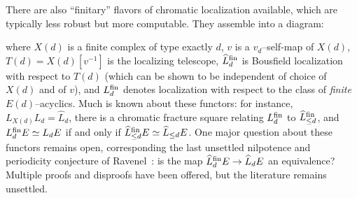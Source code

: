 \begin{remark}
There are also ``finitary'' flavors of chromatic localization available, which are typically less robust but more computable.  They assemble into a diagram:
\begin{center}
\end{center}
where $X(d)$ is a finite complex of type exactly $d$, $v$ is a $v_d$--self-map of $X(d)$, $T(d) = X(d)[v^{-1}]$ is the localizing telescope, $\widehat L_d^{\mathrm{fin}}$ is Bousfield localization with respect to $T(d)$ (which can be shown to be independent of choice of $X(d)$ and of $v$), and $L_d^{\mathrm{fin}}$ denotes localization with respect to the class of \emph{finite} $E(d)$--acyclics.  Much is known about these functors: for instance, $L_{X(d)} L_d = \widehat L_d$, there is a chromatic fracture square relating $L_d^{\mathrm{fin}}$ to $\widehat L_{\le d}^{\mathrm{fin}}$, and $L_d^{\mathrm{fin}} E \simeq L_d E$ if and only if $\widehat L_{\le d}^{\mathrm{fin}} E \simeq \widehat L_{\le d} E$.  One major question about these functors remains open, corresponding the last unsettled nilpotence and periodicity conjecture of Ravenel~\cite[Conjecture 10.5]{RavenelLocalizationWRTPeriodic}: is the map $\widehat L_d^{\mathrm{fin}} E \to \widehat L_d E$ an equivalence?  Multiple proofs and disproofs have been offered, but the literature remains unsettled.
\end{remark}







